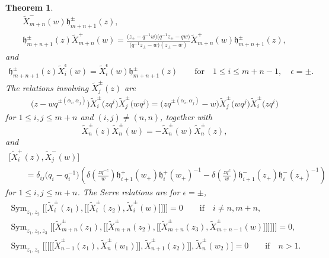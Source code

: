 \documentclass[pdftex]{sigma}
\numberwithin{equation}{section}
\newtheorem{Theorem}{Theorem}[section]
\begin{document}
\begin{Theorem}
\begin{gather*}
\widetilde{X}_{m+n}^-(w)\mathfrak{h}_{m+n+1}^{\pm}(z),\\
 \mathfrak{h}_{m+n+1}^{\pm}(z)\widetilde{X}_{m+n}^+(w)=\frac{\bigl(z_{\pm}-q^{-1}w\bigr)\bigl(q^{-1}z_{\pm}-qw\bigr)}
 {\bigl(q^{-1}z_{\pm}-w\bigr)(z_{\pm}-w)}\widetilde{X}_{m+n}^+(w)\mathfrak{h}_{m+n+1}^{\pm}(z),
\end{gather*}
and
\begin{gather*}%
\mathfrak{h}_{m+n+1}^{\pm}(z)\widetilde{X}_i^{\epsilon}(w)=\widetilde{X}_i^{\epsilon}(w)\mathfrak{h}_{m+n+1}^{\pm}(z)\qquad
 \text{for} \quad 1\leq i\leq m+n-1,\quad \epsilon=\pm .
\end{gather*}
The relations involving $\widetilde{X}_j^{\pm}(z)$ are
\begin{gather*}%
 \bigl(z-wq^{\pm (\alpha_i, \alpha_j)}\bigr)\widetilde{X}_i^{\pm}\bigl(zq^i\bigr)\widetilde{X}_j^{\pm}\bigl(wq^j\bigr)=\bigl(zq^{\pm (\alpha_i, \alpha_j)}-w\bigr)\widetilde{X}_j^{\pm}\bigl(wq^j\bigr)\widetilde{X}_i^{\pm}\bigl(zq^i\bigr)
\end{gather*}
for $1\leq i,j \leq m+n$ and $(i,j)\neq(n,n)$, together with
 \[%
 \widetilde{X}_{n}^{\pm}(z)\widetilde{X}_n^{\pm}(w)=-\widetilde{X}_n^{\pm}(w)\widetilde{X}_n^{\pm}(z),
\]
and
\begin{gather*}%
 \bigl[\widetilde{X}_i^{+}(z), \widetilde{X}_j^{-}(w)\bigr]\\
 \qquad=\delta_{ij}\bigl(q_i-q_i^{-1}\bigr)\left(\delta\left(\frac{zq^{-c}}{w}\right)\mathfrak{h}_{i+1}^+(w_+)
 \mathfrak{h}_i^+(w_+)^{-1}-\delta\left(\frac{zq^{c}}{w}\right)\mathfrak{h}_{i+1}^-(z_+)\mathfrak{h}_i^-(z_+)^{-1}\right)
\end{gather*}
for $1\leq i,j\leq m+n$.
The Serre relations are for $\epsilon=\pm$,
\begin{gather*}%
\operatorname{Sym}_{z_1,z_2}\bigl[\!\!\bigl[\widetilde{X}_i^{\pm}(z_1),\bigl[\!\!\bigl[\widetilde{X}_i^{\pm}(z_2), \widetilde{X}_i^{\pm}(w)\bigr]\!\!\bigr] \bigr]\!\!\bigr]=0\qquad\textrm{if}\quad i\neq n,m+n, \\
\operatorname{Sym}_{z_1,z_2,z_3}\bigl[\!\!\bigl[\widetilde{X}_{m+n}^{\pm}(z_1), \bigl[\!\!\bigl[\widetilde{X}_{m+n}^{\pm}(z_2),\bigl[\!\!\bigl[\widetilde{X}_{m+n}^{\pm}(z_3), \widetilde{X}_{m+n-1}^{\pm}(w)\bigr]\!\!\bigr] \bigr]\!\!\bigr] \bigr]\!\!\bigr]=0, \\
\operatorname{Sym}_{z_1,z_2}\bigl[ \bigl[\!\!\bigl[ \bigl[\!\!\bigl[\widetilde{X}_{n-1}^{\pm}(z_1), \widetilde{X}_{n}^{\pm}(w_1)\bigr]\!\!\bigr], \widetilde{X}_{n+1}^{\pm}(z_2)\bigr]\!\!\bigr], \widetilde{X}_{n}^{\pm}(w_2)\bigr]=0
\qquad\textrm{if}\quad n>1.
\end{gather*}


\end{Theorem}
\end{document}
